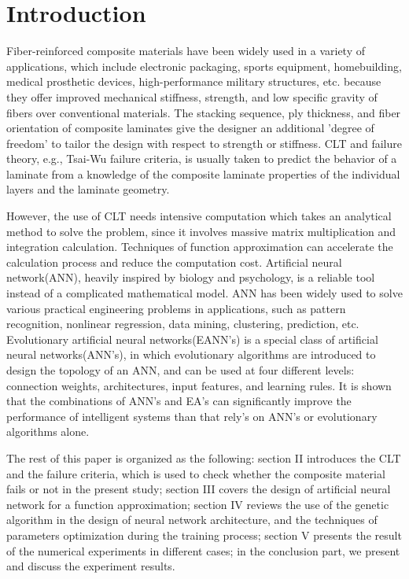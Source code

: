 \section{Introduction}
Fiber-reinforced composite materials have been widely used in a variety of
applications, which include electronic packaging, sports equipment,
homebuilding, medical prosthetic devices, high-performance military
structures, etc. because they offer improved mechanical stiffness, strength,
and low specific gravity of fibers over conventional materials.  The stacking
sequence, ply thickness, and fiber orientation of composite laminates give the
designer an additional ’degree of freedom’ to tailor the design with respect to
strength or stiffness. CLT and failure theory, e.g., Tsai-Wu failure criteria,
is usually taken to predict the behavior of a laminate from a knowledge of the
composite laminate properties of the individual layers and the laminate
geometry.

However, the use of CLT needs intensive computation which takes an analytical
method to solve the problem, since it involves massive matrix multiplication
and integration calculation. Techniques of function approximation can
accelerate the calculation process and reduce the computation cost.  Artificial
neural network(ANN), heavily inspired by biology and psychology, is a reliable
tool instead of a complicated mathematical model. ANN has been widely used to
solve various practical engineering problems in applications, such as pattern
recognition, nonlinear regression, data mining, clustering,  prediction, etc.
Evolutionary artificial neural networks(EANN's) is a special class of
artificial neural networks(ANN's), in which evolutionary algorithms are
introduced to design the topology of an ANN, and can be used at four different
levels: connection weights, architectures, input features, and learning rules.
It is shown that the combinations of ANN's and EA's can significantly improve
the performance of intelligent systems than that rely's on ANN's or
evolutionary algorithms alone.

The rest of this paper is organized as the following: section II introduces the
CLT and the failure criteria, which is used to check whether the composite
material fails or not in the present study; section III covers the design of
artificial neural network for a function approximation; section IV reviews the
use of the genetic algorithm in the design of neural network architecture, and
the techniques of parameters optimization during the training process; section
V presents the result of the numerical experiments in different cases; in the
conclusion part, we present and discuss the experiment results.




